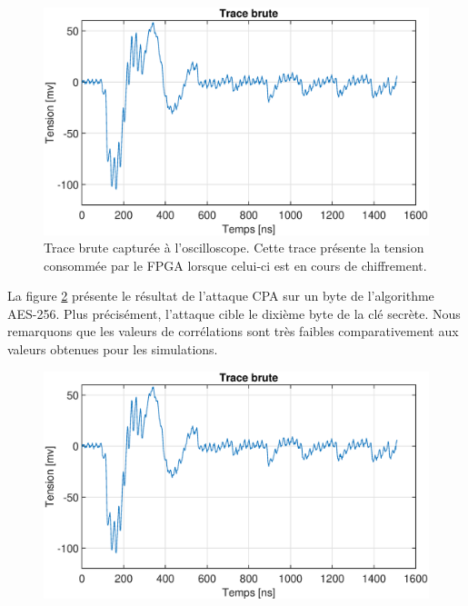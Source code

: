 \documentclass[oneside]{book}
\begin{document}
\begin{figure}[htbp]
    \hspace{-2cm}
    \includegraphics[scale=0.6]{image/trace_brute}
    \caption{Trace brute capturée à l'oscilloscope. Cette trace présente la tension consommée par le FPGA lorsque celui-ci est en cours de chiffrement.}
    \label{fig:trace_brute} 
\end{figure}

La figure \ref{fig:real_result_CPA} présente le résultat de l'attaque CPA sur un byte de l'algorithme AES-256. Plus précisément, l'attaque cible le dixième byte de la clé secrète. Nous remarquons que les valeurs de corrélations sont très faibles comparativement aux valeurs obtenues pour les simulations. 

\begin{figure}[htbp]
    \hspace{-2cm}
    \includegraphics[scale=0.6]{image/trace_brute}
    \caption{}
    \label{fig:real_result_CPA} 
\end{figure}
\end{document}
